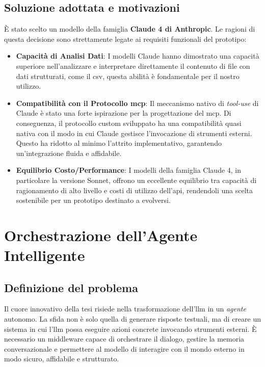 \subsection{Soluzione adottata e motivazioni}
È stato scelto un modello della famiglia \textbf{Claude 4 di Anthropic}. Le ragioni di questa decisione sono strettamente legate ai requisiti funzionali del prototipo:
\begin{itemize}
    \item \textbf{Capacità di Analisi Dati}: I modelli Claude hanno dimostrato una capacità superiore nell'analizzare e interpretare direttamente il contenuto di file con dati strutturati, come il \gls{csv}, questa abilità è fondamentale per il nostro utilizzo.
    \item \textbf{Compatibilità con il Protocollo \gls{mcp}}: Il meccanismo nativo di \textit{tool-use} di Claude è stato una forte ispirazione per la progettazione del \gls{mcp}. Di conseguenza, il protocollo custom sviluppato ha una compatibilità quasi nativa con il modo in cui Claude gestisce l'invocazione di strumenti esterni. Questo ha ridotto al minimo l'attrito implementativo, garantendo un'integrazione fluida e affidabile.
    \item \textbf{Equilibrio Costo/Performance}: I modelli della famiglia Claude 4, in particolare la versione Sonnet, offrono un eccellente equilibrio tra capacità di ragionamento di alto livello e costi di utilizzo dell'\gls{api}, rendendoli una scelta sostenibile per un prototipo destinato a evolversi.
\end{itemize}

\newpage
\section{Orchestrazione dell'Agente Intelligente}
\label{sec:agent_orchestration}

\subsection{Definizione del problema}
Il cuore innovativo della tesi risiede nella trasformazione dell'\gls{llm} in un \textit{agente} autonomo. La sfida non è solo quella di generare risposte testuali, ma di creare un sistema in cui l'\gls{llm} possa eseguire azioni concrete invocando strumenti esterni. È necessario un \gls{middleware} capace di orchestrare il dialogo, gestire la memoria conversazionale e permettere al modello di interagire con il mondo esterno in modo sicuro, affidabile e strutturato.

